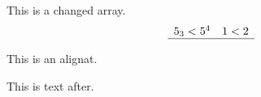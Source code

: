\documentclass{article}
\begin{document}
This is a changed array.
\[
\begin{array}{ll}
 5_3  < 5^4 & 1 < 2 \\\hline
\end{array}
\]

This is an alignat.

This is text after.
\end{document}
